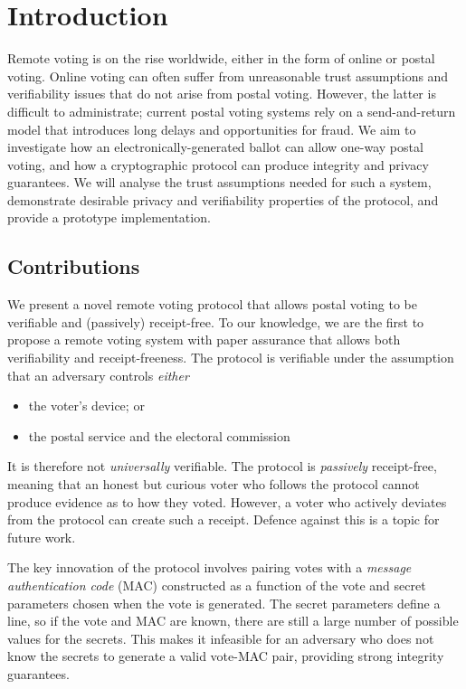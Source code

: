 \documentclass[12pt,a4paper]{article}
\theoremstyle{definition}
\begin{document}
\section{Introduction}
Remote voting is on the rise worldwide, either in the form of online or postal voting. Online voting can often suffer from unreasonable trust assumptions and verifiability issues that do not arise from postal voting. However, the latter is difficult to administrate; current postal voting systems rely on a send-and-return model that introduces long delays and opportunities for fraud. We aim to investigate how an electronically-generated ballot can allow one-way postal voting, and how a cryptographic protocol can produce integrity and privacy guarantees. We will analyse the trust assumptions needed for such a system, demonstrate desirable privacy and verifiability properties of the protocol, and provide a prototype implementation.

\subsection{Contributions}
We present a novel remote voting protocol that allows postal voting to be verifiable and (passively) receipt-free. To our knowledge, we are the first to propose a remote voting system with paper assurance that allows both verifiability and receipt-freeness. The protocol is verifiable under the assumption that an adversary controls \textit{either}
\begin{itemize}
    \item the voter's device; or
    \item the postal service and the electoral commission
\end{itemize}
It is therefore not \textit{universally} verifiable. The protocol is \textit{passively} receipt-free, meaning that an honest but curious voter who follows the protocol cannot produce evidence as to how they voted. However, a voter who actively deviates from the protocol can create such a receipt. Defence against this is a topic for future work.

The key innovation of the protocol involves pairing votes with a \textit{message authentication code} (MAC) constructed as a function of the vote and secret parameters chosen when the vote is generated. The secret parameters define a line, so if the vote and MAC are known, there are still a large number of possible values for the secrets. This makes it infeasible for an adversary who does not know the secrets to generate a valid vote-MAC pair, providing strong integrity guarantees.
\end{document}
